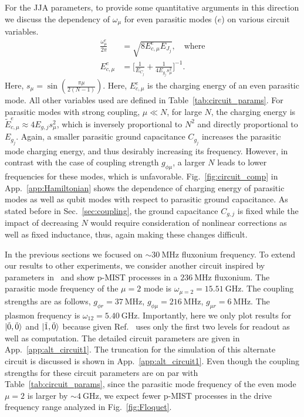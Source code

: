 \documentclass[%
reprint,
superscriptaddress,
 amsmath,amssymb,
 aps,
 prx,
longbibliography,
floatfix,
]{revtex4-2}
\begin{document}
For the JJA parameters, to provide some quantitative arguments in this direction we discuss the dependency of $\omega_\mu$ for even parasitic modes ($e$) on various circuit variables. 
\begin{align}
    \frac{\omega_\mu^e}{2\pi}&=\sqrt{8E_{c,\mu}^e E_{J_j}},\quad\text{where}\\
    E_{c,\mu}^e&=\Big[\frac{1}{E_{C_j}}+\frac{1}{4E_{g_j}s_\mu^2}\Big]^{-1}.\label{eq:parasitic}
\end{align}
Here, $s_\mu = \sin (\frac{\pi \mu}{2(N-1)})$. Here, $E_{c,\mu}^e$ is the charging energy of an even parasitic mode. All other variables used are defined in Table~\ref{tab:circuit_params}. For parasitic modes with strong coupling, $\mu\ll N$, for large $N$, the charging energy is $\tilde{E}^e_{c,\mu} \approx 4E_{g,j} s_\mu^2$, which is inversely proportional to $N^2$ and directly proportional to $E_{g_j}$. Again, a smaller parasitic ground capacitance $C_{g_j}$ increases the parasitic mode charging energy, and thus desirably increasing its frequency. However, in contrast with the case of coupling strength $g_{\phi\mu}$, a larger $N$ leads to lower frequencies for these modes, which is unfavorable. Fig.~\ref{fig:circuit_comp} in App.~\ref{app:Hamiltonian} shows the dependence of charging energy of parasitic modes as well as qubit modes with respect to parasitic ground capacitance. 
As stated before in Sec.~\ref{sec:coupling}, the ground capacitance $C_{g,j}$ is fixed while the impact of decreasing $N$ would require consideration of nonlinear corrections as well as fixed inductance, thus, again making these changes difficult. 


In the previous sections we focused on $\sim 30 \ \mathrm{MHz}$ fluxonium frequency. To extend our results to other experiments, we consider another circuit inspired by parameters in~\cite{ding_high-fidelity_2023} and show p-MIST processes in a $236 \ \mathrm{MHz}$ fluxonium. The parasitic mode frequency of the $\mu=2$ mode is $\omega_{\mu=2}=15.51 \ \mathrm{GHz}$. The coupling strengths are as follows, $g_{\phi r}=37 \ \mathrm{MHz}$, $g_{\phi\mu}=216 \ \mathrm{MHz}$, $g_{\mu r}=6 \ \mathrm{MHz}$. The plasmon frequency is $\omega_{12}=5.40 \ \mathrm{GHz}$. Importantly, here we only plot results for $\ket{\tilde{0},\tilde{0}}$ and $\ket{\tilde{1},\tilde{0}}$ because given Ref.~\cite{ding_high-fidelity_2023} uses only the first two levels for readout as well as computation. The detailed circuit parameters are given in App.~\ref{app:alt_circuit1}. The truncation for the simulation of this alternate circuit is discussed is shown in App.~\ref{app:alt_circuit1}. Even though the coupling strengths for these circuit parameters are on par with Table~\ref{tab:circuit_params}, since the parasitic mode frequency of the even mode $\mu=2$ is larger by $\sim 4 \ \mathrm{GHz}$, we expect fewer p-MIST processes in the drive frequency range analyzed in Fig.~\ref{fig:Floquet}. 
\end{document}
